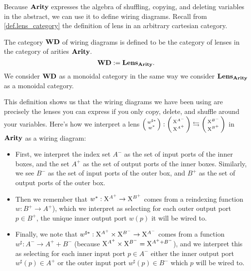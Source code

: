 \documentclass[DynamicalBook]{subfiles}
\begin{document}
Because $\textbf{Arity}$ expresses the algebra of shuffling, copying, and deleting
variables in the abstract, we can use it to define wiring diagrams. Recall from \cref{def.lens_category} the definition of lens in an arbitrary cartesian category.

\begin{definition}\label{def.category_of_wiring_diagrams}
  The category $\textbf{WD}$ of wiring diagrams is defined to be the category of
  lenses in the category of arities $\textbf{Arity}$.
  $$\textbf{WD} := \textbf{Lens}_{\textbf{Arity}}.$$
We consider $\textbf{WD}$ as a monoidal category in the same way we consider
$\textbf{Lens}_{\textbf{Arity}}$ as a monoidal category.
\end{definition}

This definition shows us that the wiring diagrams we have been using are
precisely the lenses you can express if you only copy, delete, and shuffle
around your variables. Here's how we interpret a lens
$\lens{w^{\sharp\ast}}{w^{\ast}} : \lens{\XX^{A^{-}}}{\XX^{A^+}}
\leftrightarrows \lens{\XX^{B^{-}}}{\XX^{B^+}}$ in $\textbf{Arity}$ as a
wiring diagram:
\begin{itemize}
  \item First, we interpret the index set $A^-$ as the set of input ports of the
    inner boxes, and the set $A^+$ as the set of output ports of the inner
    boxes. Similarly, we see $B^-$ as the set of input ports of the outer box,
    and $B^+$ as the set of output ports of the outer box.
  \item Then we remember that $w^{\ast} :
    \mathrm{X}^{A^+} \to \mathrm{X}^{B^+}$ comes from a reindexing function $w : B^+ \to
    A^+$), which we interpret
    as selecting for each outer output port $p \in B^+$, the unique inner output
    port $w(p)$ it will be wired to.
  \item Finally, we note that $w^{\sharp\ast} : \mathrm{X}^{A^+} \times \mathrm{X}^{B^-} \to
    \mathrm{X}^{A^-}$ comes from a function $w^{\sharp} : A^- \to A^+ + B^-$ (because
    $\mathrm{X}^{A^+} \times \mathrm{X}^{B^-} = \mathrm{X}^{A^+ + B^-}$), and we interpret this as
    selecting for each inner input port $p \in A^-$ either the inner output port
    $w^{\sharp}(p) \in A^+$ or the outer input port
    $w^{\sharp}(p) \in B^-$ which $p$ will be wired to.
\end{itemize}
\end{document}
